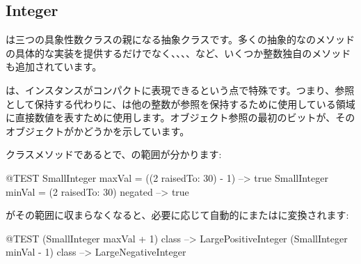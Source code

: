 \documentclass[a4paper,10pt,twoside]{book}
\begin{document}
\subsection{Integer}

は三つの具象性数クラスの親になる抽象クラスです。多くの抽象的なのメソッドの具体的な実装を提供するだけでなく、、、、など、いくつか整数独自のメソッドも追加されています。

は、インスタンスがコンパクトに表現できるという点で特殊です。つまり、参照として保持する代わりに、は他の整数が参照を保持するために使用している領域に直接数値を表すために使用します。オブジェクト参照の最初のビットが、そのオブジェクトがかどうかを示しています。

クラスメソッドであるとで、の範囲が分かります:

\begin{code}{@TEST}
SmallInteger maxVal = ((2 raisedTo: 30) - 1)      --> true
SmallInteger minVal = (2 raisedTo: 30) negated --> true
\end{code}

がその範囲に収まらなくなると、必要に応じて自動的にまたはに変換されます:

\begin{code}{@TEST}
(SmallInteger maxVal + 1) class --> LargePositiveInteger
(SmallInteger minVal - 1) class  --> LargeNegativeInteger
\end{code}
\end{document}
